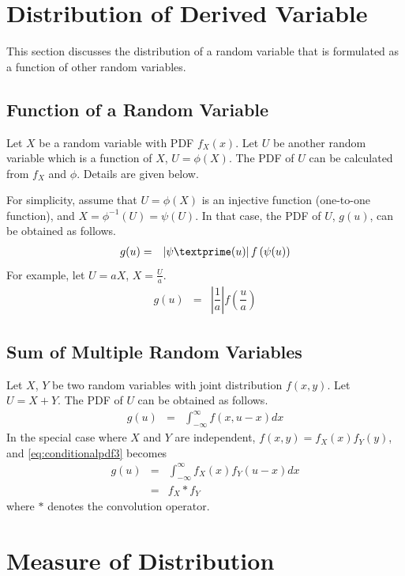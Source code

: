 \section{Distribution of Derived Variable}

This section discusses the distribution of a random variable that is formulated as a function of other random variables.

\subsection{Function of a Random Variable}

Let $X$ be a random variable with PDF $f_X(x)$. Let $U$ be another random variable which is a function of $X$, $U=\phi(X)$. The PDF of $U$ can be calculated from $f_X$ and $\phi$. Details are given below.

For simplicity, assume that $U=\phi(X)$ is an injective function (one-to-one function), and $X=\phi^{-1}(U)=\psi(U)$. In that case, the PDF of $U$, $g(u)$, can be obtained as follows.
\begin{eqnarray}
  g(u) &=& \left|\psi\textprime(u)\right|f\left(\psi(u)\right) \nonumber
\end{eqnarray}
For example, let $U=aX$, $X=\frac{U}{a}$.
\begin{eqnarray}
  g(u) &=& \left|\dfrac{1}{a}\right|f\left(\dfrac{u}{a}\right) \nonumber
\end{eqnarray}

\subsection{Sum of Multiple Random Variables}

Let $X$, $Y$ be two random variables with joint distribution $f(x, y)$. Let $U=X+Y$. The PDF of $U$ can be obtained as follows.
\begin{eqnarray}
  g(u) &=& \int_{-\infty}^{\infty} f(x, u-x)dx \label{eq:conditionalpdf3}
\end{eqnarray}
In the special case where $X$ and $Y$ are independent, $f(x, y) = f_X(x)f_Y(y)$, and \eqref{eq:conditionalpdf3} becomes
\begin{eqnarray}
  g(u) &=& \int_{-\infty}^{\infty} f_X(x)f_Y(u-x)dx \nonumber \\
  &=& f_X * f_Y \nonumber
\end{eqnarray}
where $*$ denotes the convolution operator.

\section{Measure of Distribution}

